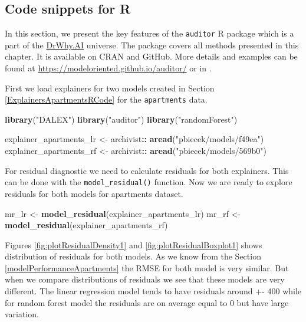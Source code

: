 \documentclass[12pt,]{krantz}
\newenvironment{Shaded}{\begin{snugshade}}{\end{snugshade}}
\newcommand{\KeywordTok}[1]{\textcolor[rgb]{0.13,0.29,0.53}{\textbf{#1}}}
\newcommand{\NormalTok}[1]{#1}
\newcommand{\OperatorTok}[1]{\textcolor[rgb]{0.81,0.36,0.00}{\textbf{#1}}}
\newcommand{\StringTok}[1]{\textcolor[rgb]{0.31,0.60,0.02}{#1}}
\begin{document}
\hypertarget{code-snippets-for-r}{%
\subsection{Code snippets for R}\label{code-snippets-for-r}}

In this section, we present the key features of the \texttt{auditor} R package \citep{auditor} which is a part of the \href{http://DrWhy.AI}{DrWhy.AI} universe. The package covers all methods presented in this chapter. It is available on CRAN and GitHub. More details and examples can be found at \url{https://modeloriented.github.io/auditor/} or in \citep{auditorarxiv}.

First we load explainers for two models created in Section \ref{ExplainersApartmentsRCode} for the \texttt{apartments} data.

\begin{Shaded}
\begin{Highlighting}[]
\KeywordTok{library}\NormalTok{(}\StringTok{"DALEX"}\NormalTok{)}
\KeywordTok{library}\NormalTok{(}\StringTok{"auditor"}\NormalTok{)}
\KeywordTok{library}\NormalTok{(}\StringTok{"randomForest"}\NormalTok{)}

\NormalTok{explainer_apartments_lr <-}\StringTok{ }\NormalTok{archivist}\OperatorTok{::}\StringTok{ }\KeywordTok{aread}\NormalTok{(}\StringTok{"pbiecek/models/f49ea"}\NormalTok{)}
\NormalTok{explainer_apartments_rf <-}\StringTok{ }\NormalTok{archivist}\OperatorTok{::}\StringTok{ }\KeywordTok{aread}\NormalTok{(}\StringTok{"pbiecek/models/569b0"}\NormalTok{)}
\end{Highlighting}
\end{Shaded}

For residual diagnostic we need to calculate residuals for both explainers. This can be done with the \texttt{model\_residual()} function. Now we are ready to explore residuals for both models for apartments dataset.

\begin{Shaded}
\begin{Highlighting}[]
\NormalTok{mr_lr <-}\StringTok{ }\KeywordTok{model_residual}\NormalTok{(explainer_apartments_lr)}
\NormalTok{mr_rf <-}\StringTok{ }\KeywordTok{model_residual}\NormalTok{(explainer_apartments_rf)}
\end{Highlighting}
\end{Shaded}

Figures \ref{fig:plotResidualDensity1} and \ref{fig:plotResidualBoxplot1} shows distribution of residuals for both models. As we know from the Section \ref{modelPerformanceApartments} the RMSE for both model is very similar. But when we compare distributions of residuals we see that these models are very different. The linear regression model tends to have residuals around +- 400 while for random forest model the residuals are on average equal to 0 but have large variation.
\end{document}
